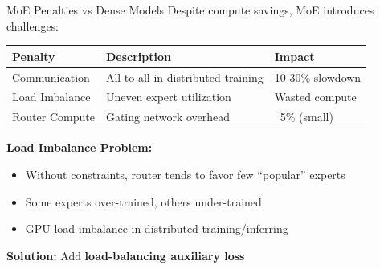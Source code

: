 \documentclass[aspectratio=169,10pt]{beamer}
\begin{document}
\begin{frame}{MoE Penalties vs Dense Models}
    Despite compute savings, MoE introduces challenges:

    \vspace{0.5cm}
    \begin{table}
        \centering
        \small
        \begin{tabular}{lll}
            \toprule
            \textbf{Penalty} & \textbf{Description} & \textbf{Impact} \\
            \midrule
            Communication & All-to-all in distributed training & 10-30\% slowdown \\
            Load Imbalance & Uneven expert utilization & Wasted compute \\
            Router Compute & Gating network overhead & ~5\% (small) \\
            \bottomrule
        \end{tabular}
    \end{table}

    \vspace{0.5cm}
    \textbf{Load Imbalance Problem:}
    \begin{itemize}
        \item Without constraints, router tends to favor few ``popular'' experts
        \item Some experts over-trained, others under-trained
        \item GPU load imbalance in distributed training/inferring
    \end{itemize}

    \vspace{0.5cm}
    \textbf{Solution:} Add \textbf{load-balancing auxiliary loss}
\end{frame}
\end{document}
